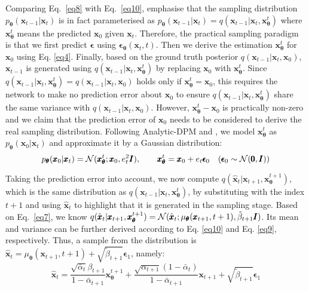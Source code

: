 \documentclass{article} \usepackage{iclr2024_conference,times}
\begin{document}
Comparing Eq.~\ref{eq8} with Eq.~\ref{eq10}, \citet{DDIM} emphasise that the sampling distribution $p_{\pmb{\theta}}(\pmb{x}_{t-1} | \pmb{x}_t)$ is in fact parameterised as $p_{\pmb{\theta}}(\pmb{x}_{t-1} | \pmb{x}_t) = q(\pmb{x}_{t-1} | \pmb{x}_t, \pmb{x}^{t}_{\pmb{\theta}})$ where $\pmb{x}^{t}_{\pmb{\theta}}$ means the predicted $\pmb{x}_0$ given $\pmb{x}_t$. Therefore, the practical sampling paradigm is that we first predict $\pmb{\epsilon}$ using $\pmb{\epsilon}_{\pmb{\theta}} (\pmb{x}_t, t)$. Then we derive the estimation $\pmb{x}^{t}_{\pmb{\theta}}$ for $\pmb{x}_0$ using Eq. \ref{eq4}. Finally, based on the ground truth posterior $q(\pmb{x}_{t-1} | \pmb{x}_{t}, \pmb{x}_{0})$, $\pmb{x}_{t-1}$ is generated using $q(\pmb{x}_{t-1} | \pmb{x}_t, \pmb{x}^{t}_{\pmb{\theta}})$ by replacing $\pmb{x}_0$ with $\pmb{x}^{t}_{\pmb{\theta}}$. 
Since $q(\pmb{x}_{t-1} | \pmb{x}_t, \pmb{x}^{t}_{\pmb{\theta}}) = q(\pmb{x}_{t-1} | \pmb{x}_t, \pmb{x}_0)$ holds only if $\pmb{x}^{t}_{\pmb{\theta}} = \pmb{x}_0$, this requires the network to make no prediction error about $\pmb{x}_0$ to ensure $q(\pmb{x}_{t-1} | \pmb{x}_t, \pmb{x}^{t}_{\pmb{\theta}})$ share the same variance with $q(\pmb{x}_{t-1} | \pmb{x}_t, \pmb{x}_0)$. However, $\pmb{x}^{t}_{\pmb{\theta}} - \pmb{x}_0$ is practically non-zero and we claim that the prediction error of $\pmb{x}_0$ needs to be considered to derive the real sampling distribution. Following Analytic-DPM  \citep{bao2022analytic} and \citet{bao2022estimating}, we model $\pmb{x}^{t}_{\pmb{\theta}}$ as $p_{\pmb{\theta}}(\pmb{x}_{0} | \pmb{x}_{t})$ and approximate it by a Gaussian distribution:
\begin{equation}
\label{eq15}
p_{\pmb{\theta}}(\pmb{x}_{0} | \pmb{x}_{t}) = {\cal N} (\pmb{x}^{t}_{\pmb{\theta}}; \pmb{x}_{0}, e_{t}^{2} \pmb{I}), \qquad \pmb{x}^{t}_{\pmb{\theta}} = \pmb{x}_{0} + e_t \pmb{\epsilon}_0 \quad (\pmb{\epsilon}_0 \sim {\cal N} (\pmb{0}, \pmb{I}))
\end{equation}



\noindent
Taking the prediction error into account, we now compute $q(\hat{\pmb{x}}_{t} | \pmb{x}_{t+1}, \pmb{x}^{t+1}_{\pmb{\theta}})$, which is the same distribution as $q(\pmb{x}_{t-1} | \pmb{x}_t, \pmb{x}^{t}_{\pmb{\theta}})$, by substituting with the index $t+1$ and using $\hat{\pmb{x}}_{t}$ to highlight that it is generated in the sampling stage. Based on Eq.~\ref{eq7}, we know $q(\hat{\pmb{x}}_{t} | \pmb{x}_{t+1}, \pmb{x}^{t+1}_{\pmb{\theta}}) = {\cal N} (\hat{\pmb{x}}_{t}; \mu_{\pmb{\theta}}(\pmb{x}_{t+1}, t+1), \tilde{\beta}_{t+1} \pmb{I})$. Its mean and variance can be further derived according to Eq. \ref{eq10} and Eq. \ref{eq9}, respectively. Thus, a sample from the distribution is $\hat{\pmb{x}}_{t} = \mu_{\pmb{\theta}}(\pmb{x}_{t+1}, t+1) + \sqrt{ \tilde{\beta}_{t+1}} \pmb{\epsilon}_1 \nonumber$, namely:
\begin{equation}
\label{eq17}
\hat{\pmb{x}}_{t} = \frac{\sqrt{\bar{\alpha}_{t}} \beta_{t+1}}{1-\bar{\alpha}_{t+1}} \pmb{x}^{t+1}_{\pmb{\theta}} + \frac{\sqrt{\alpha_{t+1}}(1-\bar{\alpha}_{t})}{1-\bar{\alpha}_{t+1}} \pmb{x}_{t+1} + \sqrt{ \tilde{\beta}_{t+1}} \pmb{\epsilon}_1
\end{equation}
\end{document}
